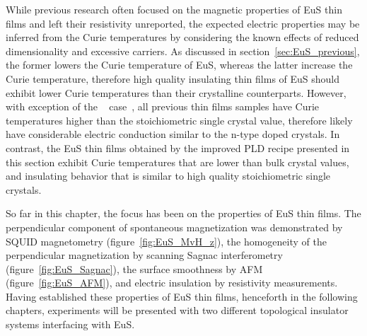 While previous research often focused on the magnetic properties of EuS thin films and left their resistivity unreported, the expected electric properties may be inferred from the Curie temperatures by considering the known effects of reduced dimensionality and excessive carriers. As discussed in section~\ref{sec:EuS_previous}, the former lowers the Curie temperature of EuS, whereas the latter increase the Curie temperature, therefore high quality insulating thin films of EuS should exhibit lower Curie temperatures than their crystalline counterparts. However, with exception of the \citeauthor{EuS_MBE_Dauth}~\citeyear{EuS_MBE_Dauth} case~\cite{EuS_MBE_Dauth}, all previous thin films samples have Curie temperatures higher than the stoichiometric single crystal value, therefore likely have considerable electric conduction similar to the n-type doped crystals. In contrast, the EuS thin films obtained by the improved PLD recipe presented in this section exhibit Curie temperatures that are lower than bulk crystal values, and insulating behavior that is similar to high quality stoichiometric single crystals.

So far in this chapter, the focus has been on the properties of EuS thin films. The perpendicular component of spontaneous magnetization was demonstrated by SQUID magnetometry (figure~\ref{fig:EuS_MvH_z}), the homogeneity of the perpendicular magnetization by scanning Sagnac interferometry (figure~\ref{fig:EuS_Sagnac}), the surface smoothness by AFM (figure~\ref{fig:EuS_AFM}), and electric insulation by resistivity measurements. Having established these properties of EuS thin films, henceforth in the following chapters, experiments will be presented with two different topological insulator systems interfacing with EuS.